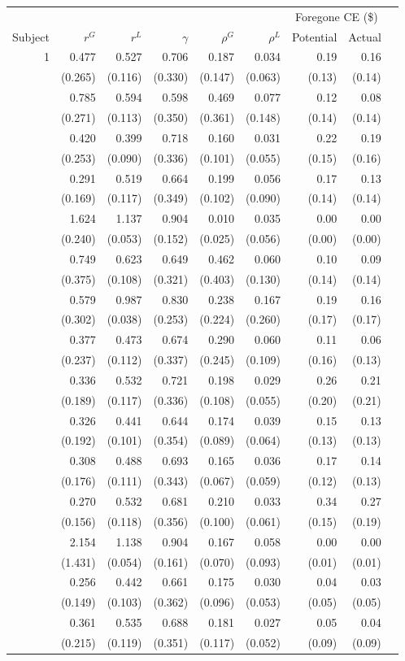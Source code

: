 \begin{longtable}{rrrrrrrrr} \hline\hline 
 & &&  & & & \multicolumn{2}{c}{Foregone CE (\$)} \\ 
Subject & $r^G$ & $r^L$ & $\gamma$ & $\rho^G$ & $\rho^L$& Potential & Actual \\ \hline1&0.477&0.527&0.706&0.187&0.034&0.19&0.16\\&(0.265)&(0.116)&(0.330)&(0.147)&(0.063)&(0.13)&(0.14) \\ \addlinespace[0.05cm] 2&0.785&0.594&0.598&0.469&0.077&0.12&0.08\\&(0.271)&(0.113)&(0.350)&(0.361)&(0.148)&(0.14)&(0.14) \\ \addlinespace[0.05cm] 3&0.420&0.399&0.718&0.160&0.031&0.22&0.19\\&(0.253)&(0.090)&(0.336)&(0.101)&(0.055)&(0.15)&(0.16) \\ \addlinespace[0.05cm] 4&0.291&0.519&0.664&0.199&0.056&0.17&0.13\\&(0.169)&(0.117)&(0.349)&(0.102)&(0.090)&(0.14)&(0.14) \\ \addlinespace[0.05cm] 5&1.624&1.137&0.904&0.010&0.035&0.00&0.00\\&(0.240)&(0.053)&(0.152)&(0.025)&(0.056)&(0.00)&(0.00) \\ \addlinespace[0.05cm] 6&0.749&0.623&0.649&0.462&0.060&0.10&0.09\\&(0.375)&(0.108)&(0.321)&(0.403)&(0.130)&(0.14)&(0.14) \\ \addlinespace[0.05cm] 7&0.579&0.987&0.830&0.238&0.167&0.19&0.16\\&(0.302)&(0.038)&(0.253)&(0.224)&(0.260)&(0.17)&(0.17) \\ \addlinespace[0.05cm] 8&0.377&0.473&0.674&0.290&0.060&0.11&0.06\\&(0.237)&(0.112)&(0.337)&(0.245)&(0.109)&(0.16)&(0.13) \\ \addlinespace[0.05cm] 9&0.336&0.532&0.721&0.198&0.029&0.26&0.21\\&(0.189)&(0.117)&(0.336)&(0.108)&(0.055)&(0.20)&(0.21) \\ \addlinespace[0.05cm] 10&0.326&0.441&0.644&0.174&0.039&0.15&0.13\\&(0.192)&(0.101)&(0.354)&(0.089)&(0.064)&(0.13)&(0.13) \\ \addlinespace[0.05cm] 11&0.308&0.488&0.693&0.165&0.036&0.17&0.14\\&(0.176)&(0.111)&(0.343)&(0.067)&(0.059)&(0.12)&(0.13) \\ \addlinespace[0.05cm] 12&0.270&0.532&0.681&0.210&0.033&0.34&0.27\\&(0.156)&(0.118)&(0.356)&(0.100)&(0.061)&(0.15)&(0.19) \\ \addlinespace[0.05cm] 13&2.154&1.138&0.904&0.167&0.058&0.00&0.00\\&(1.431)&(0.054)&(0.161)&(0.070)&(0.093)&(0.01)&(0.01) \\ \addlinespace[0.05cm] 14&0.256&0.442&0.661&0.175&0.030&0.04&0.03\\&(0.149)&(0.103)&(0.362)&(0.096)&(0.053)&(0.05)&(0.05) \\ \addlinespace[0.05cm] 15&0.361&0.535&0.688&0.181&0.027&0.05&0.04\\&(0.215)&(0.119)&(0.351)&(0.117)&(0.052)&(0.09)&(0.09) \\ 
\end{longtable}
